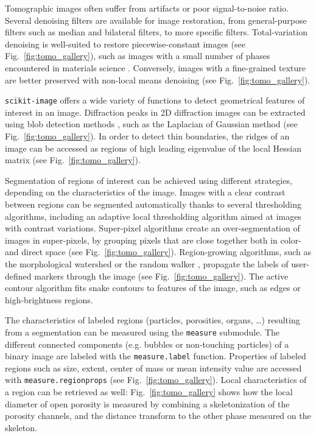 \documentclass[twocolumn]{bmcart}%
\begin{document}
Tomographic images often suffer from artifacts or poor signal-to-noise
ratio. Several denoising filters are available for image restoration,
from general-purpose filters such as median and bilateral filters, to
more specific filters. Total-variation denoising \citep{Chambolle2004,
Getreuer2012} is well-suited to restore piecewise-constant images (see
Fig.~\ref{fig:tomo_gallery}), such as images with a small number of
phases encountered in materials science \citep{Bouttes2015}. Conversely,
images with a fine-grained texture are better preserved with non-local
means denoising \citep{Buades2005} (see Fig.~\ref{fig:tomo_gallery}).

\texttt{scikit-image} offers a wide variety of functions to detect
geometrical features of interest in an image. Diffraction peaks in 2D
diffraction images can be extracted using blob detection methods
\citep{Ashiotis2015}, such as the Laplacian of Gaussian method (see
Fig.~\ref{fig:tomo_gallery}). In order to detect thin boundaries, the
ridges of an image can be accessed as regions of high leading eigenvalue
of the local Hessian matrix (see Fig.~\ref{fig:tomo_gallery}).

Segmentation of regions of interest can be achieved using different
strategies, depending on the characteristics of the image. Images with a
clear contrast between regions can be segmented automatically thanks to
several thresholding algorithms, including an adaptive local thresholding
algorithm aimed at images with contrast variations. Super-pixel
algorithms \citep{Felzenszwalb2004, Achanta2012} create an over-segmentation
of images in
super-pixels, by grouping pixels that are close together both in color-
and direct space (see Fig.~\ref{fig:tomo_gallery}). Region-growing
algorithms, such as the morphological
watershed or the random walker \citep{Grady2006}, propagate the labels
of user-defined markers through the image (see
Fig.~\ref{fig:tomo_gallery}). The active contour
algorithm \citep{Kass1988} fits snake contours to features of the
image, such as edges or high-brightness regions.

The characteristics of labeled regions (particles, porosities, organs,
\dots) resulting from a segmentation can be measured using the
\texttt{measure} submodule. The different connected components (e.g.
bubbles or non-touching particles) of a binary image are labeled with the
\texttt{measure.label} function. Properties of labeled regions such as
size, extent, center of mass or mean intensity value are accessed with
\texttt{measure.regionprops} (see Fig.~\ref{fig:tomo_gallery}). Local
characteristics of a region can be retrieved as well:
Fig.~\ref{fig:tomo_gallery} shows how the local diameter of open
porosity is measured by combining a skeletonization of the porosity
channels, and the distance transform to the other phase measured on the
skeleton.   
\end{document}
